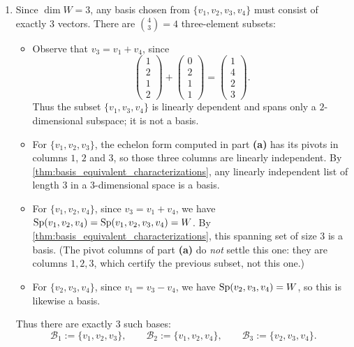 \begin{exercisesolution*}
\begin{enumerate}[label=\textbf{(\alph*)}]
    \item Since $\dim W = 3$, any basis chosen from $\{v_1, v_2, v_3, v_4\}$ must consist of exactly $3$ vectors. There are $\binom{4}{3} = 4$ three-element subsets:
    \begin{itemize}
        \item Observe that $v_3 = v_1 + v_4$, since
        \[
            \begin{pmatrix} 1 \\ 2 \\ 1 \\ 2 \end{pmatrix} + \begin{pmatrix} 0 \\ 2 \\ 1 \\ 1 \end{pmatrix} = \begin{pmatrix} 1 \\ 4 \\ 2 \\ 3 \end{pmatrix}.
        \]
        Thus the subset $\{v_1, v_3, v_4\}$ is linearly dependent and spans only a $2$-dimensional subspace; it is not a basis.
        \item For $\{v_1, v_2, v_3\}$, the echelon form computed in part \textbf{(a)} has its pivots in columns $1$, $2$ and $3$, so those three columns are linearly independent. By \cref{thm:basis_equivalent_characterizations}, any linearly independent list of length $3$ in a $3$-dimensional space is a basis.
        \item For $\{v_1, v_2, v_4\}$, since $v_3 = v_1 + v_4$, we have $\operatorname{Sp}(v_1, v_2, v_4) = \operatorname{Sp}(v_1, v_2, v_3, v_4) = W$. By \cref{thm:basis_equivalent_characterizations}, this spanning set of size $3$ is a basis. (The pivot columns of part \textbf{(a)} do \emph{not} settle this one: they are columns $1,2,3$, which certify the previous subset, not this one.)
        \item For $\{v_2, v_3, v_4\}$, since $v_1 = v_3 - v_4$, we have $\operatorname{Sp}(v_2, v_3, v_4) = W$, so this is likewise a basis.
    \end{itemize}
    Thus there are exactly $3$ such bases:
    \[
        \mathcal{B}_1 := \{v_1, v_2, v_3\}, \qquad \mathcal{B}_2 := \{v_1, v_2, v_4\}, \qquad \mathcal{B}_3 := \{v_2, v_3, v_4\}.
    \]
\end{enumerate}
\end{exercisesolution*}

